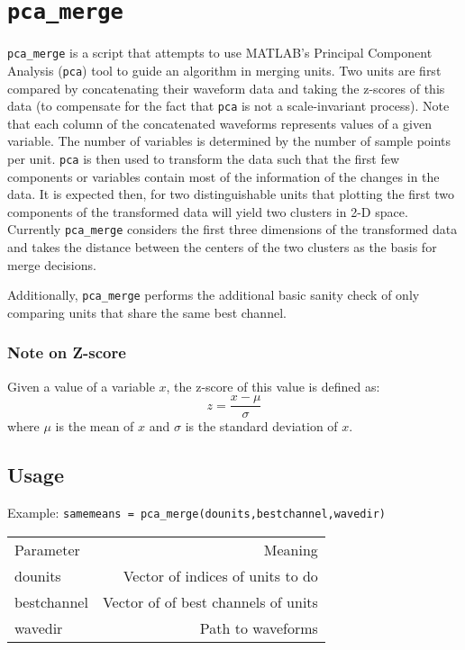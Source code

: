 \documentclass{article}
\begin{document}
\section{\texttt{pca\_merge}}
\texttt{pca\_merge} is a script that attempts to use MATLAB's Principal
Component Analysis (\texttt{pca}) tool to guide an algorithm in merging units. 
Two units are first compared by concatenating their waveform data and
taking the z-scores of this data (to compensate for the fact that
\texttt{pca} is not a scale-invariant process). Note that each column of
the concatenated waveforms represents values of a given variable. The
number of variables is determined by the number of sample points per
unit. \texttt{pca} is then used to transform the data such that 
the first few components or variables contain most of the information of
the changes in the data. It is expected then, for two distinguishable
units that plotting the first two components of the transformed data
will yield two clusters in 2-D space. Currently \texttt{pca\_merge}
considers the first three dimensions of the transformed data and takes
the distance between the centers of the two clusters as the basis for
merge decisions. 

Additionally, \texttt{pca\_merge} performs the additional basic sanity
check of only comparing units that share the same best channel.

\subsubsection{Note on Z-score}
Given a value of a variable \ensuremath{x}, the z-score of this value is
defined as:
\begin{equation}
z =\frac{ x - \mu}{\sigma}
\end{equation}
where \ensuremath{\mu} is the mean of \ensuremath{x} and
\ensuremath{\sigma} is the standard deviation of \ensuremath{x}.

\subsection{Usage}

Example:
\texttt{samemeans = pca\_merge(dounits,bestchannel,wavedir)}
\begin{center}
\begin{tabular}{l r}
Parameter&Meaning\\
dounits&Vector of indices of units to do\\
bestchannel&Vector of of best channels of units\\
wavedir &Path to waveforms
\end{tabular}
\end{center}
\end{document}
